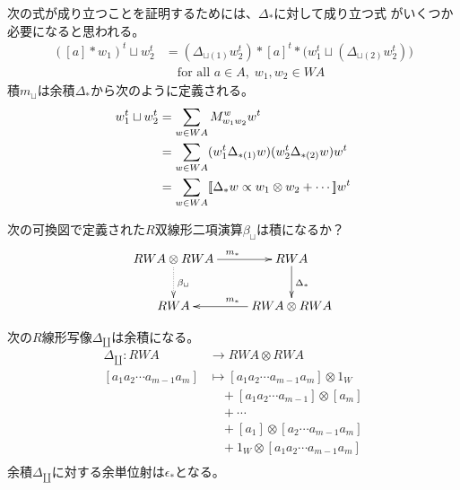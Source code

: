 	\begin{todo}[余積の計算]\label{todo:余積の計算} %
		次の式が成り立つことを証明するためには、$\Delta_*$に対して成り立つ式
		がいくつか必要になると思われる。
		\begin{equation*}\begin{split} %
			([a]*w_1)^t\sqcup w_2^t 
			&= (\Delta_{\sqcup(1)}w_2^t)*[a]^t
				*\bigl(w_1^t\sqcup(\Delta_{\sqcup(2)}w_2^t)\bigr) \\
			&\quad\text{for all }a\in A,\;w_1,w_2\in WA
		\end{split}\end{equation*} %
		積$m_\sqcup$は余積$\Delta_*$から次のように定義される。
		\begin{equation*}\begin{split} %
			w_1^t\sqcup w_2^t &= \sum_{w\in WA}M_{w_1w_2}^ww^t \\
			&= \sum_{w\in WA}(w_1^t\Delta_{*(1)}w)(w_2^t\Delta_{*(2)}w)w^t \\
			&= \sum_{w\in WA}\jump{\Delta_{*}w\propto w_1\otimes w_2+\cdots}w^t \\
		\end{split}\end{equation*} %
	\end{todo} %

	\begin{todo}[ここまで]\label{todo:ここまで} %
	\end{todo} %

	\begin{todo}[シャッフル積]\label{todo:シャッフル積} %
		次の可換図で定義された$R$双線形二項演算$\beta_\sqcup$は積になるか？
		\begin{equation}\xymatrix{
			RWA\otimes RWA \ar[r]^{m_*} \ar@{.>}[d]^{\beta_\sqcup} 
			& RWA \ar[d]^{\Delta_*} \\
			RWA & RWA\otimes RWA \ar[l]_{m_*} \\
		}\end{equation}
	\end{todo} %

	次の$R$線形写像$\Delta_\amalg$は余積になる。
	\begin{equation}\begin{split} %
		\Delta_\amalg: RWA &\to RWA\otimes RWA \\
			[a_1a_2\cdots a_{m-1}a_m] 
				&\mapsto [a_1a_2\cdots a_{m-1}a_m]\otimes 1_W \\
				&\quad + [a_1a_2\cdots a_{m-1}]\otimes [a_m] \\
				&\quad + \cdots \\
				&\quad + [a_1]\otimes [a_2\cdots a_{m-1}a_m] \\
				&\quad + 1_W\otimes [a_1a_2\cdots a_{m-1}a_m] \\
	\end{split}\end{equation} %
	余積$\Delta_\amalg$に対する余単位射は$\epsilon_*$となる。

